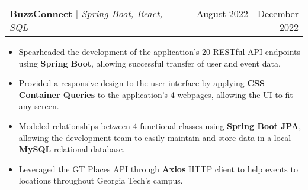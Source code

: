 \documentclass[letterpaper,11pt]{article}
\makeatletter
\newcommand{\resumeProjectHeading}[3]{
    \begin{tabular*}{0.97\textwidth}[t]{l@{\extracolsep{\fill}}r}
      \textbf{#1} $\vert$ \textit{#2}  & {#3}
    \end{tabular*}\vspace{-3pt}
}
\newcommand{\resumeItemListStart}{\begin{itemize}[noitemsep]\vspace{-4pt}}
\newcommand{\resumeItemListEnd}{\end{itemize}}
\makeatother
\begin{document}
    \resumeProjectHeading{BuzzConnect}{Spring Boot, React, SQL}{August 2022 - December 2022}
      \resumeItemListStart
        \item {Spearheaded the development of the application's 20 RESTful API endpoints using \textbf{Spring Boot},  allowing successful transfer of user and event data.}
        \item {Provided a responsive design to the user interface by applying \textbf{CSS Container Queries} to the application's 4 webpages, allowing the UI to fit any screen.}
        \item {Modeled relationships between 4 functional classes using \textbf{Spring Boot JPA}, allowing the development team to easily maintain and store data in a local \textbf{MySQL} relational database.}
        \item {Leveraged the GT Places API through \textbf{Axios} HTTP client to help events to locations throughout Georgia Tech's campus.}
      \resumeItemListEnd
\end{document}
